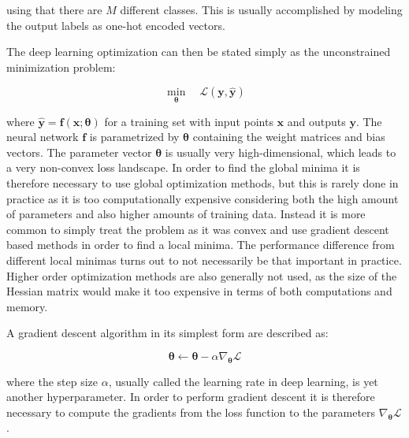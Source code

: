 \noindent using that there are $M$ different classes. This is usually accomplished by modeling the output labels as one-hot encoded vectors.

The deep learning optimization can then be stated simply as the unconstrained minimization problem:

\begin{equation}
    \min_{\bm{\theta}} \quad \mathcal{L}(\bm{y}, \bm{\hat{y}})
\end{equation}

\noindent where $\bm{\hat{y}} = \bm{f}(\bm{x}; \bm{\theta})$ for a training set with input points $\bm{x}$ and outputs $\bm{y}$. The neural network $\bm{f}$ is parametrized by $\bm{\theta}$ containing the weight matrices and bias vectors. The parameter vector $\bm{\theta}$ is usually very high-dimensional, which leads to a very non-convex loss landscape. In order to find the global minima it is therefore necessary to use global optimization methods, but this is rarely done in practice as it is too computationally expensive considering both the high amount of parameters and also higher amounts of training data. Instead it is more common to simply treat the problem as it was convex and use gradient descent based methods in order to find a local minima. The performance difference from different local minimas turns out to not necessarily be that important in practice. Higher order optimization methods are also generally not used, as the size of the Hessian matrix would make it too expensive in terms of both computations and memory.

A gradient descent algorithm in its simplest form are described as:

\begin{equation}
    \bm{\theta} \leftarrow \bm{\theta} - \alpha \nabla_{\bm{\theta}} \mathcal{L}
    \label{eq:sgd}
\end{equation}

\noindent where the step size $\alpha$, usually called the learning rate in deep learning, is yet another hyperparameter. In order to perform gradient descent it is therefore necessary to compute the gradients from the loss function to the parameters $\nabla_{\bm{\theta}} \mathcal{L}$.

